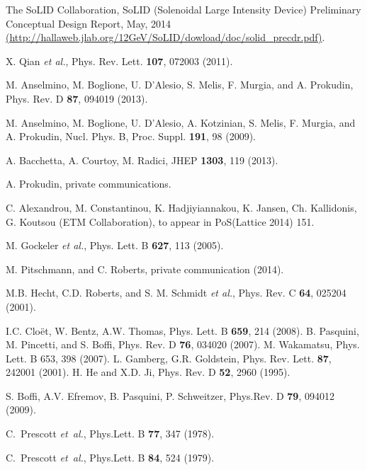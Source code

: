 \documentclass[12pt]{article}
\begin{document}
\begin{thebibliography}{99}
The SoLID Collaboration, SoLID (Solenoidal Large Intensity Device) Preliminary Conceptual Design Report, May, 2014 
\url{(http://hallaweb.jlab.org/12GeV/SoLID/dowload/doc/solid_precdr.pdf)}.

X. Qian {\it et al.}, Phys. Rev. Lett. {\bf 107}, 072003 (2011).

M. Anselmino, M. Boglione, U. D'Alesio, S. Melis, F. Murgia, and A. Prokudin, 
Phys. Rev. D {\bf 87}, 094019 (2013).

M. Anselmino, M. Boglione, U. D'Alesio, A. Kotzinian, S. Melis, F. Murgia, and A. Prokudin, Nucl. Phys. B, Proc. Suppl. {\bf 191}, 98 (2009).

A. Bacchetta, A. Courtoy, M. Radici, JHEP {\bf 1303}, 119 (2013).

A. Prokudin, private communications.

 C. Alexandrou, M. Constantinou, K. Hadjiyiannakou,
 K. Jansen, Ch. Kallidonis, G. Koutsou (ETM Collaboration),
to appear in PoS(Lattice 2014) 151.

M. Gockeler {\it et al.}, Phys. Lett. B {\bf 627}, 113 (2005).

M. Pitschmann, and C. Roberts, private communication (2014). 

M.B. Hecht, C.D. Roberts, and S. M. Schmidt {\it et al.}, Phys. Rev. C {\bf 64}, 025204 (2001).

I.C. Clo\"{e}t, W. Bentz, A.W. Thomas, Phys. Lett. B {\bf 659}, 214 (2008).
B. Pasquini, M. Pincetti, and S. Boffi, Phys. Rev. D {\bf 76}, 034020 (2007).
M. Wakamatsu, Phys. Lett. B 653, 398 (2007).
L. Gamberg, G.R. Goldstein, Phys. Rev. Lett. {\bf 87}, 242001 (2001).
H. He and X.D. Ji, Phys. Rev. D {\bf 52}, 2960 (1995).

S. Boffi, A.V. Efremov, B. Pasquini, P. Schweitzer,
Phys.Rev. D {\bf 79}, 094012 (2009).

C.~Prescott {\em et~al.},
\newblock Phys.Lett. B {\bf 77}, 347 (1978).

C.~Prescott {\em et~al.},
\newblock Phys.Lett. B {\bf 84}, 524 (1979).


\end{thebibliography}
\end{document}
